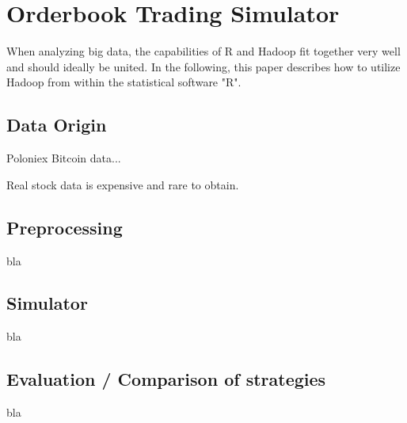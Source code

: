 
\chapter{Orderbook Trading Simulator}
\label{chap:simulator}
When analyzing big data, the capabilities of R and Hadoop fit together very well and should ideally be united. In the following, this paper describes how to utilize Hadoop from within the statistical software "R". 

\section{Data Origin}
Poloniex Bitcoin data...

Real stock data is expensive and rare to obtain.

\section{Preprocessing}
bla

\section{Simulator}
bla

\section{Evaluation / Comparison of strategies}
bla

\cleardoublepage{}